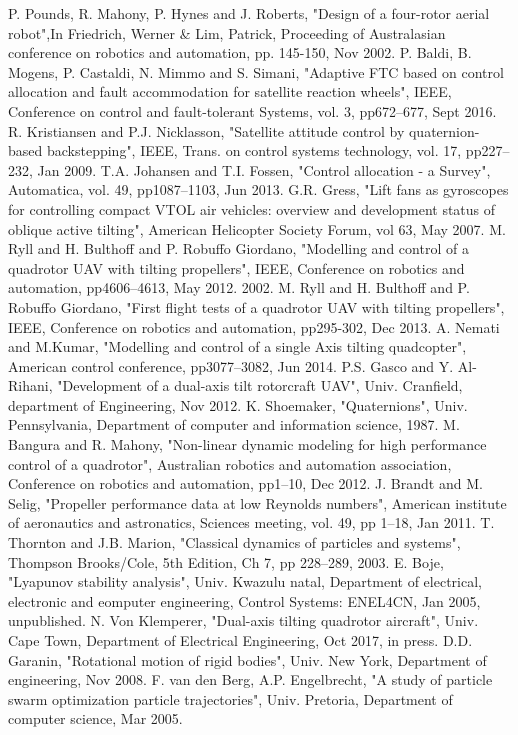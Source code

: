\documentclass[a4paper, 10pt, conference]{ieeeconf}
\begin{document}
\begin{thebibliography}{00}
 P. Pounds, R. Mahony, P. Hynes and J. Roberts, "Design of a four-rotor aerial robot",In Friedrich, Werner \& Lim, Patrick, Proceeding of Australasian conference on robotics and automation, pp. 145-150, Nov 2002.
 P. Baldi, B. Mogens, P. Castaldi, N. Mimmo and S. Simani, "Adaptive FTC based on control allocation and fault accommodation for satellite reaction wheels", IEEE, Conference on control and fault-tolerant Systems, vol. 3, pp672--677, Sept 2016.
 R. Kristiansen and P.J. Nicklasson, "Satellite attitude control by quaternion-based backstepping", IEEE, Trans. on control systems technology, vol. 17, pp227--232, Jan 2009.
 T.A. Johansen and T.I. Fossen, "Control allocation - a Survey", Automatica, vol. 49, pp1087--1103, Jun 2013.
 G.R. Gress, "Lift fans as gyroscopes for controlling compact VTOL air vehicles: overview and development status of oblique active tilting", American Helicopter Society Forum, vol 63, May 2007.
 M. Ryll and H. Bulthoff and P. Robuffo Giordano, "Modelling and control of a quadrotor UAV with tilting propellers", IEEE, Conference on robotics and automation, pp4606--4613, May 2012.
2002.
 M. Ryll and H. Bulthoff and P. Robuffo Giordano, "First flight tests of a quadrotor UAV with tilting propellers", IEEE, Conference on robotics and automation, pp295-302, Dec 2013.
 A. Nemati and M.Kumar, "Modelling and control of a single Axis tilting quadcopter", American control conference, pp3077--3082, Jun 2014.
 P.S. Gasco and Y. Al-Rihani, "Development of a dual-axis tilt rotorcraft UAV", Univ. Cranfield, department of Engineering, Nov 2012.
 K. Shoemaker, "Quaternions", Univ. Pennsylvania, Department of computer and information science, 1987.
 M. Bangura and R. Mahony, "Non-linear dynamic modeling for high performance control of a quadrotor", Australian robotics and automation association, Conference on robotics and automation, pp1--10, Dec 2012.
 J. Brandt and M. Selig, "Propeller performance data at low Reynolds numbers", American institute of aeronautics and astronatics, Sciences meeting, vol. 49, pp 1--18, Jan 2011.
 T. Thornton and J.B. Marion, "Classical dynamics of particles and systems", Thompson Brooks/Cole, 5th Edition, Ch 7, pp 228--289, 2003.
 E. Boje, "Lyapunov stability analysis", Univ. Kwazulu natal, Department of electrical, electronic and eomputer engineering, Control Systems: ENEL4CN, Jan 2005, unpublished.
 N. Von Klemperer, "Dual-axis tilting quadrotor aircraft", Univ. Cape Town,  Department of Electrical Engineering, Oct 2017, in press.
 D.D. Garanin, "Rotational motion of rigid bodies", Univ. New York, Department of engineering, Nov 2008.
 F. van den Berg, A.P. Engelbrecht, "A study of particle swarm optimization particle trajectories", Univ. Pretoria, Department of computer science, Mar 2005.
\end{thebibliography}
\end{document}
